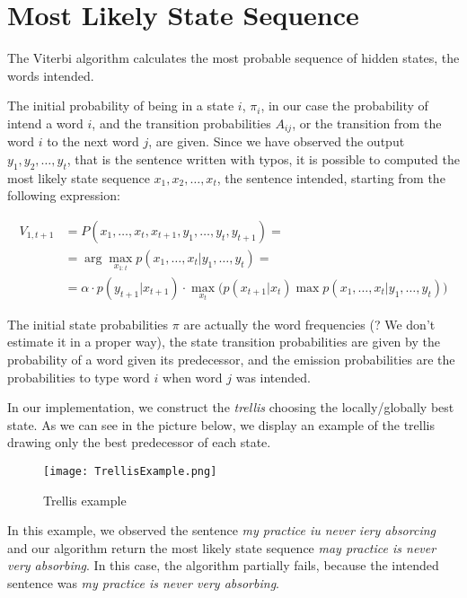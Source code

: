 \section{Most Likely State Sequence}

The Viterbi algorithm calculates the most probable sequence of hidden states, the words intended.

The initial probability of being in a state $i$, $\pi_i$, in our case the probability of intend a word $i$, and the 
transition probabilities $A_{ij}$, or the transition from the word $i$ to the next word $j$, are given. Since we have 
observed the output $y_1, y_2, \dots , y_t$, that is the sentence written with typos, it is possible to computed the most 
likely state sequence $x_1, x_2, \dots , x_t$, the sentence intended, starting from the following expression:

\begin{equation}
	\begin{aligned}
		V_{1,t+1} &= P(x_1, \dots, x_t, x_{t+1}, y_1, \dots, y_t,  y_{t+1}) = \\
						&= \arg\max_{x_{1:t}} p(x_1, \dots, x_t | y_1, \dots, y_t) = \\
						& =  \alpha \cdot p(y_{t+1}|x_{t+1})\cdot\max_{x_t} \Big( p(x_{t+1}|x_t) \max p(x_1, \dots, x_{t}|y_1, 
						\dots, y_t)\Big)
	\end{aligned}
\end{equation}

The initial state probabilities $\pi$ are actually the word frequencies (? We don’t estimate it in a proper way), the state 
transition probabilities are given by the probability of a word given its predecessor, and the emission probabilities are the 
probabilities to type word $i$ when word $j$ was intended.

In our implementation, we construct the \textit{trellis} choosing the locally/globally best state. As we can see in the 
picture below, we display an example of the trellis drawing only the best predecessor of each state.

\begin{figure}[H]
	\centering
	\texttt{[image: TrellisExample.png]}
	\caption{Trellis example}
	\label{fig:trellis}
\end{figure}

In this example, we observed the sentence \textsl{my practice iu never iery absorcing} and our algorithm return the most 
likely state sequence \textsl{may practice is never very absorbing}. In this case, the algorithm partially fails, because the 
intended sentence was \textsl{my practice is never very absorbing}.
\\

